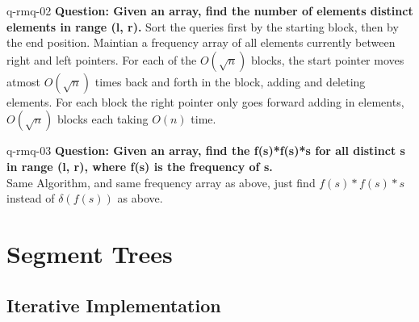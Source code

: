 \begin{example}{q-rmq-02}
    \textbf{Question: Given an array, find the number of elements distinct elements in range (l, r).}
    Sort the queries first by the starting block, then by the end position. Maintian a frequency array of all elements currently between right and left pointers. For each of the $O(\sqrt{n})$ blocks, the start pointer moves atmost $O(\sqrt{n})$ times back and forth in the block, adding and deleting elements. For each block the right pointer only goes forward adding in elements, $O(\sqrt{n})$ blocks each taking $O(n)$ time.
\end{example}

\begin{example}{q-rmq-03}
    \textbf{Question: Given an array, find the f(s)*f(s)*s for all distinct s in range (l, r), where f(s) is the frequency of s.} \\
    Same Algorithm, and same frequency array as above, just find $f(s)*f(s)*s$ instead of $\delta(f(s))$ as above.
\end{example}



\section{Segment Trees}

\subsection{Iterative Implementation}

